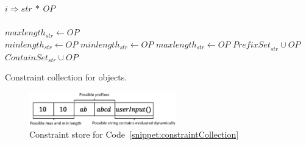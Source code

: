 \begin{algorithm}[t]
\scriptsize
\DontPrintSemicolon
{}
\Begin
{
  {
   $i \Rightarrow str\ *\ OP$ \\
    {\\
   \mytab $maxlength_{str} \longleftarrow OP$\\
   \mytab $minlength_{str} \longleftarrow OP$
   }  {
    $minlength_{str} \longleftarrow OP$
   }  {
    $maxlength_{str} \longleftarrow OP$
   }  {
    $\textit{PrefixSet}_{str} \cup OP$
   }  {
    $\textit{ContainSet}_{str} \cup OP$
   }
  }
}
\caption{Constraint collection for  objects.}
\label{algo:constraintCollection}
\end{algorithm}

\begin{figure}[t]
\centering
\includegraphics[width=2.5in]{images/ConstraintExample.eps}
\caption{Constraint store for Code~\ref{snippet:constraintCollection}}
\label{fig:constraintExample}
\end{figure}


